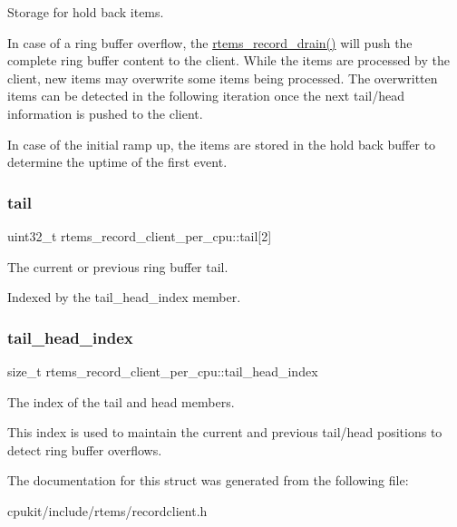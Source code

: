Storage for hold back items. 

In case of a ring buffer overflow, the \mbox{\hyperlink{group__RTEMSRecord_ga99ed015930e0cc3e9c1a802b80dacb69}{rtems\+\_\+record\+\_\+drain()}} will push the complete ring buffer content to the client. While the items are processed by the client, new items may overwrite some items being processed. The overwritten items can be detected in the following iteration once the next tail/head information is pushed to the client.

In case of the initial ramp up, the items are stored in the hold back buffer to determine the uptime of the first event. \mbox{\label{structrtems__record__client__per__cpu_a59dbb9d3e3f5ed2a50e9ac3e266e2ad4}} 
\subsubsection{\texorpdfstring{tail}{tail}}
{\footnotesize\ttfamily uint32\+\_\+t rtems\+\_\+record\+\_\+client\+\_\+per\+\_\+cpu\+::tail\mbox{[}2\mbox{]}}



The current or previous ring buffer tail. 

Indexed by the tail\+\_\+head\+\_\+index member. \mbox{\label{structrtems__record__client__per__cpu_a15f079666f41a7b1182f84a1011f1194}} 
\subsubsection{\texorpdfstring{tail\_head\_index}{tail\_head\_index}}
{\footnotesize\ttfamily size\+\_\+t rtems\+\_\+record\+\_\+client\+\_\+per\+\_\+cpu\+::tail\+\_\+head\+\_\+index}



The index of the tail and head members. 

This index is used to maintain the current and previous tail/head positions to detect ring buffer overflows. 

The documentation for this struct was generated from the following file\+:\begin{DoxyCompactItemize}
\item 
cpukit/include/rtems/recordclient.\+h\end{DoxyCompactItemize}
